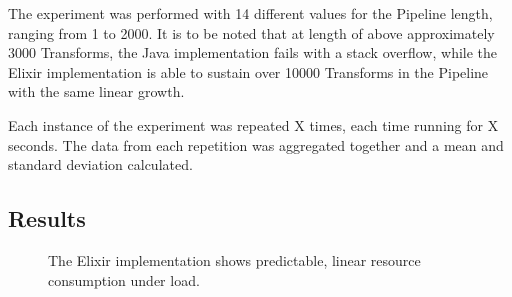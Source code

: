 The experiment was performed with 14 different values for the Pipeline length, ranging from 1 to 2000.
It is to be noted that at length of above approximately 3000 Transforms, the Java implementation fails with a stack overflow, while the Elixir implementation is able to sustain over 10000 Transforms in the Pipeline with the same linear growth.

Each instance of the experiment was repeated X times, each time running for X seconds.
The data from each repetition was aggregated together and a mean and standard deviation calculated.

\subsection{Results}

\begin{figure}
    \centering
	
	\caption[Results of the latency experiment run on the Elixir implementation.]{The Elixir implementation shows predictable, linear resource consumption under load.}
	\label{fig:eval:latency-graph-elixir}
\end{figure}

